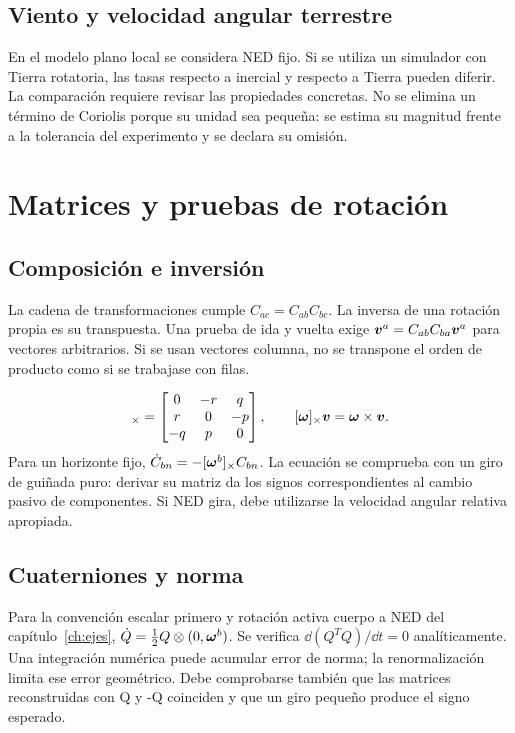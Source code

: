 \section{Viento y velocidad angular terrestre}
En el modelo plano local se considera NED fijo. Si se utiliza un simulador con Tierra rotatoria, las tasas respecto a inercial y respecto a Tierra pueden diferir. La comparación requiere revisar las propiedades concretas. No se elimina un término de Coriolis porque su unidad sea pequeña: se estima su magnitud frente a la tolerancia del experimento y se declara su omisión.

\chapter{Matrices y pruebas de rotación}
\section{Composición e inversión}
La cadena de transformaciones cumple $C_{ac}=C_{ab}C_{bc}$. La inversa de una rotación propia es su transpuesta. Una prueba de ida y vuelta exige $\boldsymbol{v}^a=C_{ab}C_{ba}\boldsymbol{v}^a$ para vectores arbitrarios. Si se usan vectores columna, no se transpone el orden de producto como si se trabajase con filas.

\begin{equation}
[\vect\omega]_\times=\begin{bmatrix}0&-r&q\\r&0&-p\\-q&p&0\end{bmatrix},\qquad
[\vect\omega]_\times\vect v=\vect\omega\times\vect v.
\end{equation}
Para un horizonte fijo, $\dot C_{bn}=-[\boldsymbol{\omega}^b]_\times C_{bn}$. La ecuación se comprueba con un giro de guiñada puro: derivar su matriz da los signos correspondientes al cambio pasivo de componentes. Si NED gira, debe utilizarse la velocidad angular relativa apropiada.

\section{Cuaterniones y norma}
Para la convención escalar primero y rotación activa cuerpo a NED del capítulo~\ref{ch:ejes}, $\dot Q=\tfrac12Q\otimes(0,\boldsymbol{\omega}^b)$. Se verifica $\dd(Q^TQ)/\dd t=0$ analíticamente. Una integración numérica puede acumular error de norma; la renormalización limita ese error geométrico. Debe comprobarse también que las matrices reconstruidas con Q y -Q coinciden y que un giro pequeño produce el signo esperado.

